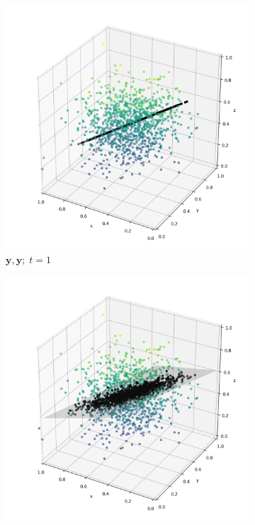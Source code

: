 \documentclass[12pt, aspectratio=169]{beamer}
\newcommand{\yy}{\mathbf{y}}
\begin{document}
\begin{frame}
\begin{figure}[H]
		\medskip
		\begin{subfigure}{0.2\textwidth}
			\includegraphics[width=\linewidth]{resources/Y_Y_1_simulated.png}
			\caption{$\yy, \yy; \; t=1$}
			\label{fig:4}
		\end{subfigure}\hfil
		\begin{subfigure}{0.2\textwidth}
			\includegraphics[width=\linewidth]{resources/Y_Y_2_simulated.png}

\end{subfigure}
\end{figure}
\end{frame}
\end{document}
